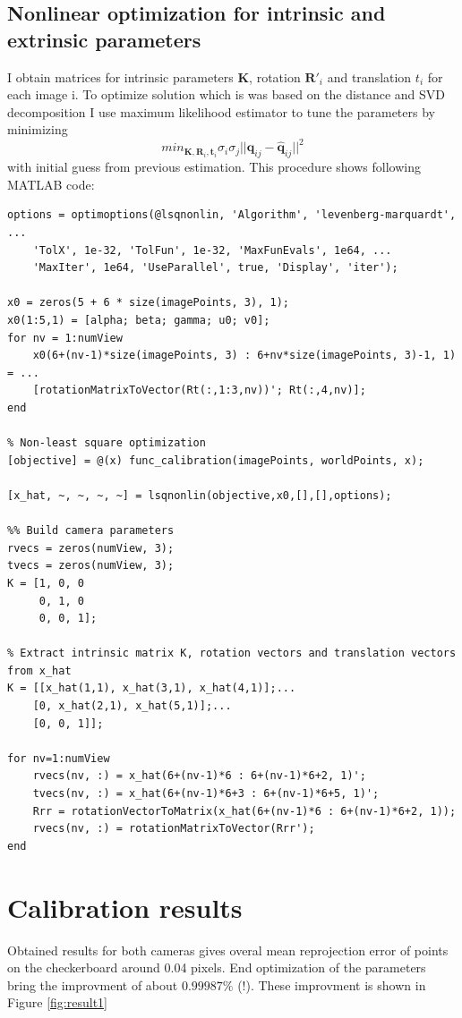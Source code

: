 \subsection*{Nonlinear optimization for intrinsic and extrinsic parameters}
I obtain matrices for intrinsic parameters $\mathbf{K}$, rotation $\mathbf{R}'_i$ and translation $t_i$ for each image i. To optimize solution which is was based on the distance and SVD decomposition I use maximum likelihood estimator to tune the parameters by minimizing 
$$min_{\mathbf{K},\mathbf{R}_i,\mathbf{t}_i}\sigma_{i}\sigma_{j}||\mathbf{q}_{ij}-\mathbf{\hat{q}}_{ij}||^2$$ with initial guess from previous estimation. This procedure shows following MATLAB code:
\begin{lstlisting}[style=Matlab-editor]
%% Maximum likelihood estimation (section 3.2)
options = optimoptions(@lsqnonlin, 'Algorithm', 'levenberg-marquardt', ...
    'TolX', 1e-32, 'TolFun', 1e-32, 'MaxFunEvals', 1e64, ...
    'MaxIter', 1e64, 'UseParallel', true, 'Display', 'iter');

x0 = zeros(5 + 6 * size(imagePoints, 3), 1);
x0(1:5,1) = [alpha; beta; gamma; u0; v0];
for nv = 1:numView
    x0(6+(nv-1)*size(imagePoints, 3) : 6+nv*size(imagePoints, 3)-1, 1) = ...
    [rotationMatrixToVector(Rt(:,1:3,nv))'; Rt(:,4,nv)]; 
end

% Non-least square optimization
[objective] = @(x) func_calibration(imagePoints, worldPoints, x);

[x_hat, ~, ~, ~, ~] = lsqnonlin(objective,x0,[],[],options);

%% Build camera parameters
rvecs = zeros(numView, 3);
tvecs = zeros(numView, 3);
K = [1, 0, 0
     0, 1, 0
     0, 0, 1];

% Extract intrinsic matrix K, rotation vectors and translation vectors from x_hat
K = [[x_hat(1,1), x_hat(3,1), x_hat(4,1)];...
    [0, x_hat(2,1), x_hat(5,1)];...
    [0, 0, 1]];

for nv=1:numView
    rvecs(nv, :) = x_hat(6+(nv-1)*6 : 6+(nv-1)*6+2, 1)';
    tvecs(nv, :) = x_hat(6+(nv-1)*6+3 : 6+(nv-1)*6+5, 1)';
    Rrr = rotationVectorToMatrix(x_hat(6+(nv-1)*6 : 6+(nv-1)*6+2, 1));
    rvecs(nv, :) = rotationMatrixToVector(Rrr');
end
\end{lstlisting}

\section*{Calibration results}
Obtained results for both cameras gives overal mean reprojection error of points on the checkerboard around 0.04 pixels. End optimization of the parameters bring the improvment of about $0.99987 \%$ (!). These improvment is shown in Figure \ref{fig:result1}

